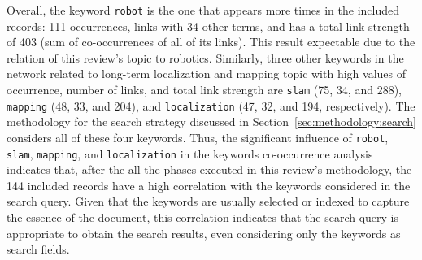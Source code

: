 Overall, the keyword \texttt{robot} is the one that appears more times in the included records: 111 occurrences, links with 34 other terms, and has a total link strength of 403 (sum of co-occurrences of all of its links). This result expectable due to the relation of this review's topic to robotics.
Similarly, three other keywords in the network related to long-term localization and mapping topic with high values of occurrence, number of links, and total link strength are \texttt{slam} (75, 34, and 288), \texttt{mapping} (48, 33, and 204), and \texttt{localization} (47, 32, and 194, respectively). The methodology for the search strategy discussed in Section~\ref{sec:methodology:search} considers all of these four keywords. Thus, the significant influence of \texttt{robot}, \texttt{slam}, \texttt{mapping}, and \texttt{localization} in the keywords co-occurrence analysis indicates that, after the all the phases executed in this review's methodology, the 144 included records have a high correlation with the keywords considered in the search query. Given that the keywords are usually selected or indexed to capture the essence of the document, this correlation indicates that the search query is appropriate to obtain the search results, even considering only the keywords as search fields.


